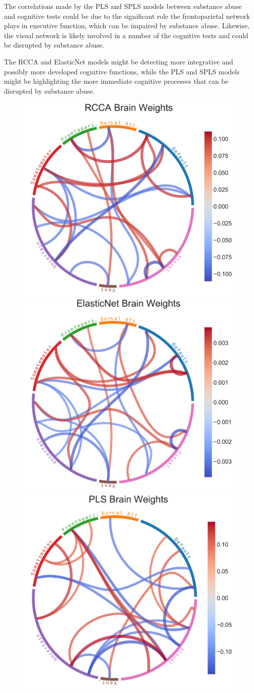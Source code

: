 The correlations made by the PLS and SPLS models between substance abuse and cognitive tests could be due to the significant role the frontoparietal network plays in executive function, which can be impaired by substance abuse.
Likewise, the visual network is likely involved in a number of the cognitive tests and could be disrupted by substance abuse.

The RCCA and ElasticNet models might be detecting more integrative and possibly more developed cognitive functions, while the PLS and SPLS models might be highlighting the more immediate cognitive processes that can be disrupted by substance abuse.

\begin{figure}[h]
    \centering
    \includegraphics[width=0.49\linewidth]{figures/hcp/RCCA brain weights}
    \includegraphics[width=0.49\linewidth]{figures/hcp/ElasticNet brain weights}
    \includegraphics[width=0.49\linewidth]{figures/hcp/PLS brain weights}

\end{figure}
